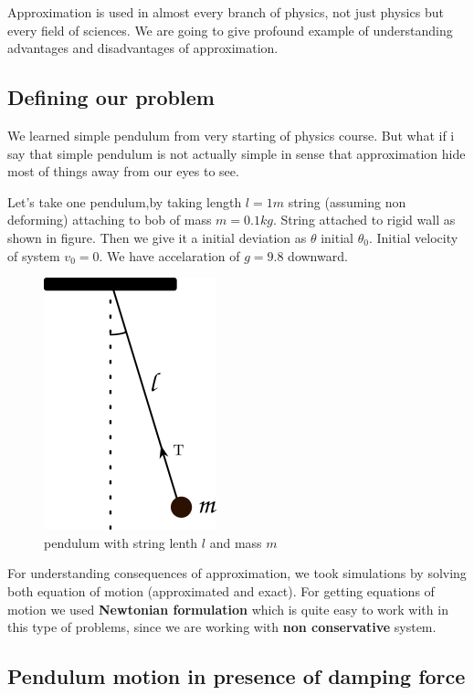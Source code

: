 \documentclass[11pt,a4paper]{article}
\begin{document}
Approximation is used in almost every branch of physics, not just physics but every field of sciences. We are going to give profound example of understanding advantages and disadvantages of approximation.

\subsection{Defining our problem}
\label{sec:org4e09d72}

We learned simple pendulum from very starting of physics course. But what if i say that simple pendulum is not actually simple in sense that approximation hide most of things away from our eyes to see.

Let's take one pendulum,by taking length \(l = 1 m\) string (assuming non deforming) attaching to bob of mass \(m = 0.1 kg\). String attached to rigid wall as shown in figure. Then we give it a initial deviation as \(\theta\) initial \(\theta_{0}\). Initial velocity of system \(v_{0}=0\). We have accelaration of \(g=9.8\) downward.

\begin{figure}[htbp]
\centering
\includegraphics[width=0.3 \textwidth]{./figure1.png}
\caption{\label{fig:org0bc5868}pendulum with string lenth \(l\) and mass \(m\)}
\end{figure}

For understanding consequences of approximation, we took simulations by solving both equation of motion (approximated and exact). For getting equations of motion we used \textbf{Newtonian formulation} which is quite easy to work with in this type of problems, since we are working with \textbf{non conservative} system.


\subsection{Pendulum motion in presence of damping force}
\label{sec:orgc63e694}
\end{document}
